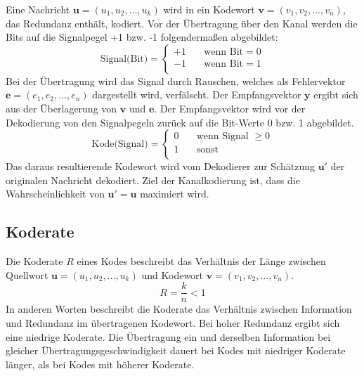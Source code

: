 Eine Nachricht $\mathbf{u}=\left( u_{1},u_{2},\dots ,u_{k}\right)$ wird in ein Kodewort $\mathbf{v}=\left( v_{1},v_{2},\dots ,v_{n}\right)$, das Redundanz enthält, kodiert. Vor der Übertragung über den Kanal werden die Bits auf die Signalpegel +1 bzw. -1 folgendermaßen abgebildet:
\begin{equation}
\text{Signal(Bit)} =
\begin{cases}
  +1  & \quad \text{wenn Bit} = 0\\
  -1  & \quad \text{wenn Bit} = 1\\
\end{cases}
\label{eq:bit_zu_signal_abbildung}
\end{equation}
Bei der Übertragung wird das Signal durch Rauschen, welches als Fehlervektor $\mathbf{e}=\left( e_{1},e_{2},\dots ,e_{n}\right)$ dargestellt wird, verfälscht. Der Empfangsvektor $\mathbf{y}$ ergibt sich aus der Überlagerung von $\mathbf{v}$ und $\mathbf{e}$. Der Empfangsvektor wird vor der Dekodierung von den Signalpegeln zurück auf die Bit-Werte 0 bzw. 1 abgebildet.
\begin{equation}
\text{Kode(Signal)} =
\begin{cases}
  0  & \quad \text{wenn Signal } \geq 0\\
  1  & \quad \text{sonst}\\
\end{cases}
\label{eq:signal_zu_bit_abbildung}
\end{equation}
Das daraus resultierende Kodewort wird vom Dekodierer zur Schätzung $\mathbf{u'}$ der originalen Nachricht dekodiert. Ziel der Kanalkodierung ist, dass die Wahrscheinlichkeit von $\mathbf{u'}=\mathbf{u}$ maximiert wird.

\subsection{Koderate}
\label{kapitel:grundlagen_koderate}
Die Koderate $R$ eines Kodes beschreibt das Verhältnis der Länge zwischen Quellwort $\mathbf{u}=\left( u_{1},u_{2},\dots ,u_{k}\right)$ und Kodewort $\mathbf{v}=\left( v_{1},v_{2},\dots ,v_{n}\right)$.
\begin{equation}
R=\frac{k}{n}<1
\end{equation}
In anderen Worten beschreibt die Koderate das Verhältnis zwischen Information und Redundanz im übertragenen Kodewort. Bei hoher Redundanz ergibt sich eine niedrige Koderate. Die Übertragung ein und derselben Information bei gleicher Übertragungsgeschwindigkeit dauert bei Kodes mit niedriger Koderate länger, als bei Kodes mit höherer Koderate.

